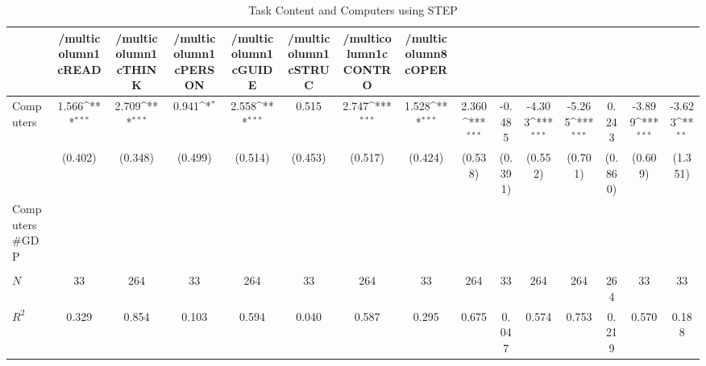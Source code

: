 \begin{table}[htbp]\centering
\def\sym#1{\ifmmode^{#1}\else\(^{#1}\)\fi}
\caption{Task Content and Computers using STEP}
\begin{tabular}{l*{14}{c}}
\hline\hline
            &/multicolumn{1}{c}{READ}&/multicolumn{1}{c}{THINK}&/multicolumn{1}{c}{PERSON}&/multicolumn{1}{c}{GUIDE}&/multicolumn{1}{c}{STRUC}&/multicolumn{1}{c}{CONTRO}&/multicolumn{8}{c}{OPER}                                                                                                                                                       \\
\hline
Computers   &       1.566\sym{***}&       2.709\sym{***}&       0.941\sym{*}  &       2.558\sym{***}&       0.515         &       2.747\sym{***}&       1.528\sym{***}&       2.360\sym{***}&      -0.485         &      -4.303\sym{***}&      -5.265\sym{***}&       0.243         &      -3.899\sym{***}&      -3.623\sym{**} \\
            &     (0.402)         &     (0.348)         &     (0.499)         &     (0.514)         &     (0.453)         &     (0.517)         &     (0.424)         &     (0.538)         &     (0.391)         &     (0.552)         &     (0.701)         &     (0.860)         &     (0.609)         &     (1.351)         \\
[1em]
Computers#GDP&                     &                     &                     &                     &                     &                     &                     &                     &                     &                     &                     &                     &                     &                     \\
            &                     &                     &                     &                     &                     &                     &                     &                     &                     &                     &                     &                     &                     &                     \\
\hline
\(N\)       &          33         &         264         &          33         &         264         &          33         &         264         &          33         &         264         &          33         &         264         &         264         &         264         &          33         &          33         \\
\(R^{2}\)   &       0.329         &       0.854         &       0.103         &       0.594         &       0.040         &       0.587         &       0.295         &       0.675         &       0.047         &       0.574         &       0.753         &       0.219         &       0.570         &       0.188         \\
\hline\hline
\end{tabular}
\end{table}
